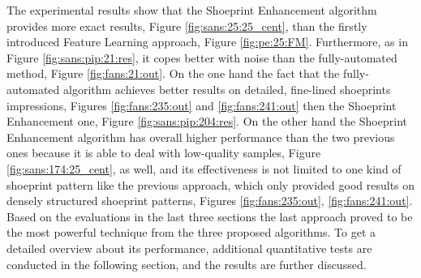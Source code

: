 \documentclass[draft,final]{vutinfth} %
\begin{document}
\par
The experimental results show that the Shoeprint Enhancement algorithm provides more exact results, Figure \ref{fig:sans:25:25_cent}, than the firstly introduced Feature Learning approach, Figure \ref{fig:pe:25:FM}.
Furthermore, as in Figure \ref{fig:sans:pip:21:res}, it copes better with noise than the fully-automated method, Figure \ref{fig:fans:21:out}.
On the one hand the fact that the fully-automated algorithm achieves better results on detailed, fine-lined shoeprints impressions, Figures \ref{fig:fans:235:out} and \ref{fig:fans:241:out} then the Shoeprint Enhancement one, Figure \ref{fig:sans:pip:204:res}.
On the other hand the Shoeprint Enhancement algorithm has overall higher performance than the two previous ones because it is able to deal with low-quality samples, Figure \ref{fig:sans:174:25_cent}, as well, and its effectiveness is not limited to one kind of shoeprint pattern like the previous approach, which only provided good results on densely structured shoeprint patterns, Figures \ref{fig:fans:235:out}, \ref{fig:fans:241:out}. 
Based on the evaluations in the last three sections the last approach proved to be the most powerful technique from the three proposed algorithms.
To get a detailed overview about its performance, additional quantitative tests are conducted in the following section, and the results are further discussed.
\end{document}
